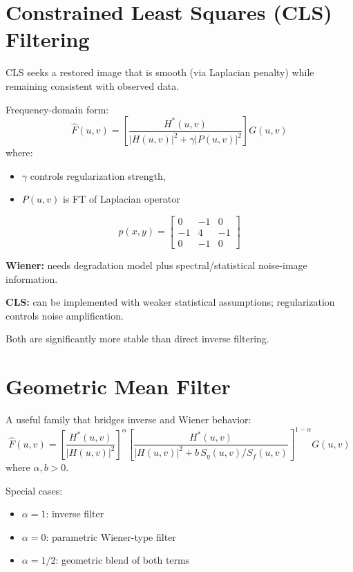 \documentclass[12pt,a4paper]{article}
\begin{document}
\section{Constrained Least Squares (CLS) Filtering}

CLS seeks a restored image that is smooth (via Laplacian penalty) while remaining consistent with observed data.

Frequency-domain form:
\[
\hat{F}(u,v)=\left[\frac{H^*(u,v)}{|H(u,v)|^2+\gamma|P(u,v)|^2}\right]G(u,v)
\]
where:
\begin{itemize}
    \item $\gamma$ controls regularization strength,
    \item $P(u,v)$ is FT of Laplacian operator
\end{itemize}

\[
p(x,y)=\begin{bmatrix}
0 & -1 & 0\\
-1 & 4 & -1\\
0 & -1 & 0
\end{bmatrix}
\]

\begin{conceptbox}
\textbf{Wiener:} needs degradation model plus spectral/statistical noise-image information.

\textbf{CLS:} can be implemented with weaker statistical assumptions; regularization controls noise amplification.

Both are significantly more stable than direct inverse filtering.
\end{conceptbox}

\section{Geometric Mean Filter}

A useful family that bridges inverse and Wiener behavior:
\[
\hat{F}(u,v)=\left[\frac{H^*(u,v)}{|H(u,v)|^2}\right]^\alpha
\left[\frac{H^*(u,v)}{|H(u,v)|^2+b\,S_\eta(u,v)/S_f(u,v)}\right]^{1-\alpha}
G(u,v)
\]
where $\alpha,b > 0$.

Special cases:
\begin{itemize}
    \item $\alpha=1$: inverse filter
    \item $\alpha=0$: parametric Wiener-type filter
    \item $\alpha=1/2$: geometric blend of both terms
\end{itemize}
\end{document}
